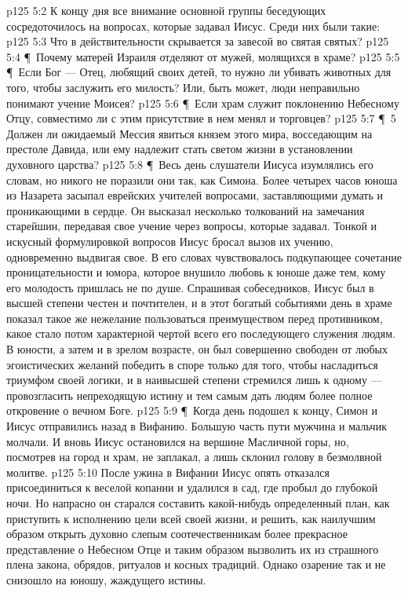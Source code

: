 \vs p125 5:2 К концу дня все внимание основной группы беседующих сосредоточилось на вопросах, которые задавал Иисус. Среди них были такие:
\vs p125 5:3 \bibnobreakspace Что в действительности скрывается за завесой во святая святых?
\vs p125 5:4 \P\ \bibnobreakspace Почему матерей Израиля отделяют от мужей, молящихся в храме?
\vs p125 5:5 \P\ \bibnobreakspace Если Бог --- Отец, любящий своих детей, то нужно ли убивать животных для того, чтобы заслужить его милость? Или, быть может, люди неправильно понимают учение Моисея?
\vs p125 5:6 \P\ \bibnobreakspace Если храм служит поклонению Небесному Отцу, совместимо ли с этим присутствие в нем менял и торговцев?
\vs p125 5:7 \P\ 5 Должен ли ожидаемый Мессия явиться князем этого мира, восседающим на престоле Давида, или ему надлежит стать светом жизни в установлении духовного царства?
\vs p125 5:8 \P\ Весь день слушатели Иисуса изумлялись его словам, но никого не поразили они так, как Симона. Более четырех часов юноша из Назарета засыпал еврейских учителей вопросами, заставляющими думать и проникающими в сердце. Он высказал несколько толкований на замечания старейшин, передавая свое учение через вопросы, которые задавал. Тонкой и искусный формулировкой вопросов Иисус бросал вызов их учению, одновременно выдвигая свое. В его словах чувствовалось подкупающее сочетание проницательности и юмора, которое внушило любовь к юноше даже тем, кому его молодость пришлась не по душе. Спрашивая собеседников, Иисус был в высшей степени честен и почтителен, и в этот богатый событиями день в храме показал такое же нежелание пользоваться преимуществом перед противником, какое стало потом характерной чертой всего его последующего служения людям. В юности, а затем и в зрелом возрасте, он был совершенно свободен от любых эгоистических желаний победить в споре только для того, чтобы насладиться триумфом своей логики, и в наивысшей степени стремился лишь к одному --- провозгласить непреходящую истину и тем самым дать людям более полное откровение о вечном Боге.
\vs p125 5:9 \P\ Когда день подошел к концу, Симон и Иисус отправились назад в Вифанию. Большую часть пути мужчина и мальчик молчали. И вновь Иисус остановился на вершине Масличной горы, но, посмотрев на город и храм, не заплакал, а лишь склонил голову в безмолвной молитве.
\vs p125 5:10 После ужина в Вифании Иисус опять отказался присоединиться к веселой копании и удалился в сад, где пробыл до глубокой ночи. Но напрасно он старался составить какой\hyp{}нибудь определенный план, как приступить к исполнению цели всей своей жизни, и решить, как наилучшим образом открыть духовно слепым соотечественникам более прекрасное представление о Небесном Отце и таким образом вызволить их из страшного плена закона, обрядов, ритуалов и косных традиций. Однако озарение так и не снизошло на юношу, жаждущего истины.
